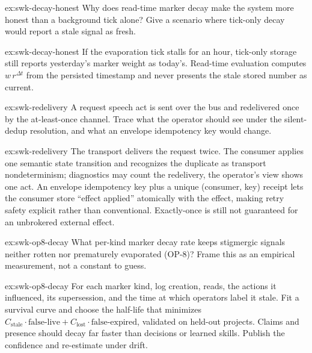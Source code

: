 \documentclass[11pt,a4paper]{article}
\theoremstyle{definition}
\theoremstyle{remark}
\begin{document}
\begin{pdexercise}[kind=Check,rating=1]{ex:swk-decay-honest}
Why does read-time marker decay make the system more honest than a background tick alone? Give a scenario where tick-only decay would report a stale signal as fresh.
\end{pdexercise}
\begin{pdsolution}{ex:swk-decay-honest}
If the evaporation tick stalls for an hour, tick-only storage still reports yesterday's marker weight as today's. Read-time evaluation computes $w\,r^{\Delta t}$ from the persisted timestamp and never presents the stale stored number as current.
\end{pdsolution}
\begin{pdexercise}[kind=Trace,rating=2]{ex:swk-redelivery}
A request speech act is sent over the bus and redelivered once by the at-least-once channel. Trace what the operator should see under the silent-dedup resolution, and what an envelope idempotency key would change.
\end{pdexercise}
\begin{pdsolution}{ex:swk-redelivery}
The transport delivers the request twice. The consumer applies one semantic state transition and recognizes the duplicate as transport nondeterminism; diagnostics may count the redelivery, the operator's view shows one act. An envelope idempotency key plus a unique (consumer, key) receipt lets the consumer store ``effect applied'' atomically with the effect, making retry safety explicit rather than conventional. Exactly-once is still not guaranteed for an unbrokered external effect.
\end{pdsolution}
\begin{pdexercise}[kind=Open,rating=3]{ex:swk-op8-decay}
What per-kind marker decay rate keeps stigmergic signals neither rotten nor prematurely evaporated (OP-8)? Frame this as an empirical measurement, not a constant to guess.
\end{pdexercise}
\begin{pdsolution}{ex:swk-op8-decay}
For each marker kind, log creation, reads, the actions it influenced, its supersession, and the time at which operators label it stale. Fit a survival curve and choose the half-life that minimizes $C_{\text{stale}}\cdot\text{false-live} + C_{\text{lost}}\cdot\text{false-expired}$, validated on held-out projects. Claims and presence should decay far faster than decisions or learned skills. Publish the confidence and re-estimate under drift.
\end{pdsolution}
\end{document}
